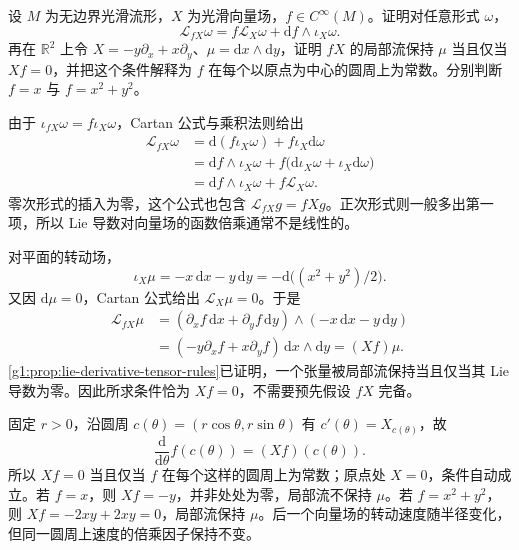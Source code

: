 \begin{exercise}\label{g1:ex:lie-function-multiple-area}
	设 \(M\) 为无边界光滑流形，\(X\) 为光滑向量场，\(f\in C^\infty(M)\)。证明对任意形式 \(\omega\)，
	\[
		\mathcal L_{fX}\omega=f\mathcal L_X\omega+\mathrm{d}f\wedge\iota_X\omega.
	\]
	再在 \(\mathbb R^2\) 上令 \(X=-y\partial_x+x\partial_y\)、\(\mu=\mathrm{d}x\wedge\mathrm{d}y\)，证明 \(fX\) 的局部流保持 \(\mu\) 当且仅当 \(Xf=0\)，并把这个条件解释为 \(f\) 在每个以原点为中心的圆周上为常数。分别判断 \(f=x\) 与 \(f=x^2+y^2\)。
\end{exercise}
\begin{solution}
	由于 \(\iota_{fX}\omega=f\iota_X\omega\)，Cartan 公式与乘积法则给出
	\begin{align*}
		\mathcal L_{fX}\omega
		&=\mathrm{d}(f\iota_X\omega)+f\iota_X\mathrm{d}\omega\\
		&=\mathrm{d}f\wedge\iota_X\omega+f\bigl(\mathrm{d}\iota_X\omega+\iota_X\mathrm{d}\omega\bigr)\\
		&=\mathrm{d}f\wedge\iota_X\omega+f\mathcal L_X\omega.
	\end{align*}
	零次形式的插入为零，这个公式也包含 \(\mathcal L_{fX}g=fXg\)。正次形式则一般多出第一项，所以 Lie 导数对向量场的函数倍乘通常不是线性的。

	对平面的转动场，
	\[
		\iota_X\mu=-x\,\mathrm{d}x-y\,\mathrm{d}y
		=-\mathrm{d}\bigl((x^2+y^2)/2\bigr).
	\]
	又因 \(\mathrm{d}\mu=0\)，Cartan 公式给出 \(\mathcal L_X\mu=0\)。于是
	\begin{align*}
		\mathcal L_{fX}\mu
		&=(\partial_xf\,\mathrm{d}x+\partial_yf\,\mathrm{d}y)\wedge(-x\,\mathrm{d}x-y\,\mathrm{d}y)\\
		&=(-y\partial_xf+x\partial_yf)\,\mathrm{d}x\wedge\mathrm{d}y
		=(Xf)\mu.
	\end{align*}
	\cref{g1:prop:lie-derivative-tensor-rules}已证明，一个张量被局部流保持当且仅当其 Lie 导数为零。因此所求条件恰为 \(Xf=0\)，不需要预先假设 \(fX\) 完备。

	固定 \(r>0\)，沿圆周 \(c(\theta)=(r\cos\theta,r\sin\theta)\) 有 \(c'(\theta)=X_{c(\theta)}\)，故
	\[
		\frac{\mathrm{d}}{\mathrm{d}\theta}f(c(\theta))=(Xf)(c(\theta)).
	\]
	所以 \(Xf=0\) 当且仅当 \(f\) 在每个这样的圆周上为常数；原点处 \(X=0\)，条件自动成立。若 \(f=x\)，则 \(Xf=-y\)，并非处处为零，局部流不保持 \(\mu\)。若 \(f=x^2+y^2\)，则 \(Xf=-2xy+2xy=0\)，局部流保持 \(\mu\)。后一个向量场的转动速度随半径变化，但同一圆周上速度的倍乘因子保持不变。
\end{solution}

